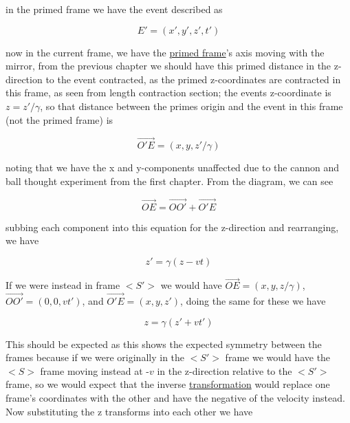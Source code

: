 in the primed frame we have the event described as

\begin{equation}
	E' = (x',y',z',t')
\end{equation}

now in the current frame, we have the \hyperlink{def-Primed-Frame}{primed frame}'s axis moving with the mirror, from the previous chapter we should have this primed distance in the z-direction to the event contracted, as the primed z-coordinates are contracted in this frame, as seen from length contraction section; the events z-coordinate is $z=z'/\gamma$, so that distance between the primes origin and the event in this frame (not the primed frame) is

\begin{equation}
	\overrightarrow{O'E} = (x,y,z'/\gamma)
\end{equation}

noting that we have the x and y-components unaffected due to the cannon and ball thought experiment from the first chapter. From the diagram, we can see

\begin{equation}
	\overrightarrow{OE}= \overrightarrow{OO'} + \overrightarrow{O'E}
	\label{eq: event}
\end{equation}

subbing each component into this equation for the z-direction and rearranging, we have

\begin{equation}
	z' = \gamma (z-vt)
\end{equation}

If we were instead in frame $<S'>$ we would have $\overrightarrow{OE}=(x,y,z/\gamma)$, $\overrightarrow{OO'}=(0,0,vt')$, and $\overrightarrow{O'E} = (x,y,z')$, doing the same for these we have

\begin{equation}
	z = \gamma (z'+vt')
\end{equation}

This should be expected as this shows the expected symmetry between the frames because if we were originally in the $<S'>$ frame we would have the $<S>$ frame moving instead at -$v$ in the z-direction relative to the $<S'>$ frame, so we would expect that the inverse \hyperlink{def-transform}{transformation} would replace one frame's coordinates with the other and have the negative of the velocity instead.
Now substituting the z transforms into each other we have


